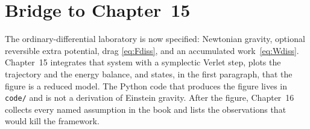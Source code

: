 \section{Bridge to Chapter~15}
\label{sec:ch14-bridge}

The ordinary-differential laboratory is now specified:
Newtonian gravity, optional reversible extra potential, drag
\eqref{eq:Fdiss}, and an accumulated work~\eqref{eq:Wdiss}.
Chapter~15 integrates that system with a symplectic Verlet step,
plots the trajectory and the energy balance, and states, in the
first paragraph, that the figure is a reduced model. The Python
code that produces the figure lives in \texttt{code/} and is not
a derivation of Einstein gravity. After the figure, Chapter~16
collects every named assumption in the book and lists the
observations that would kill the framework.
